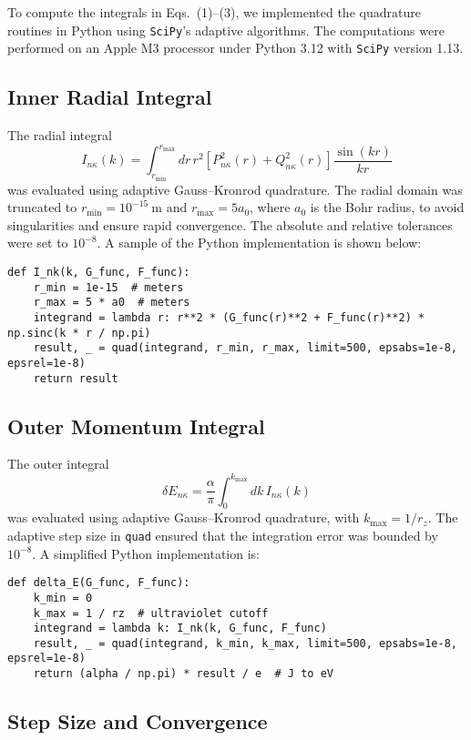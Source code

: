 \documentclass[12pt]{article}
\begin{document}
To compute the integrals in Eqs.~(1)--(3), we implemented the quadrature routines in Python using \texttt{SciPy}’s adaptive algorithms. The computations were performed on an Apple M3 processor under Python 3.12 with \texttt{SciPy} version 1.13.

\subsection*{Inner Radial Integral}

The radial integral
\[
I_{n\kappa}(k) = \int_{r_{\mathrm{min}}}^{r_{\mathrm{max}}} dr\, r^2 \left[P_{n\kappa}^2(r) + Q_{n\kappa}^2(r)\right] \frac{\sin(kr)}{kr}
\]
was evaluated using adaptive Gauss–Kronrod quadrature. The radial domain was truncated to \(r_{\mathrm{min}} = 10^{-15}~\mathrm{m}\) and \(r_{\mathrm{max}} = 5a_0\), where \(a_0\) is the Bohr radius, to avoid singularities and ensure rapid convergence. The absolute and relative tolerances were set to \(10^{-8}\). A sample of the Python implementation is shown below:

\begin{verbatim}
def I_nk(k, G_func, F_func):
    r_min = 1e-15  # meters
    r_max = 5 * a0  # meters
    integrand = lambda r: r**2 * (G_func(r)**2 + F_func(r)**2) * np.sinc(k * r / np.pi)
    result, _ = quad(integrand, r_min, r_max, limit=500, epsabs=1e-8, epsrel=1e-8)
    return result
\end{verbatim}

\subsection*{Outer Momentum Integral}

The outer integral
\[
\delta E_{n\kappa} = \frac{\alpha}{\pi} \int_0^{k_{\mathrm{max}}} dk\, I_{n\kappa}(k)
\]
was evaluated using adaptive Gauss–Kronrod quadrature, with \(k_{\mathrm{max}} = 1/r_z\). The adaptive step size in \texttt{quad} ensured that the integration error was bounded by \(10^{-8}\). A simplified Python implementation is:

\begin{verbatim}
def delta_E(G_func, F_func):
    k_min = 0
    k_max = 1 / rz  # ultraviolet cutoff
    integrand = lambda k: I_nk(k, G_func, F_func)
    result, _ = quad(integrand, k_min, k_max, limit=500, epsabs=1e-8, epsrel=1e-8)
    return (alpha / np.pi) * result / e  # J to eV
\end{verbatim}

\subsection*{Step Size and Convergence}
\end{document}
